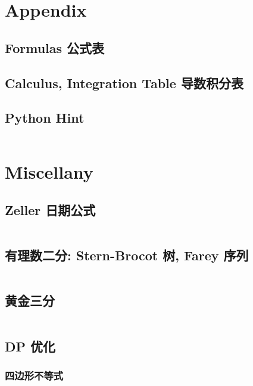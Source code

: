 \documentclass[titlepage, a4paper]{article}
\begin{document}
\begin{multicols}{2}
\begin{spacing}{0.6}
			
			\section{Appendix}
				\begin{spacing}{0.4}
				\subsection{Formulas 公式表}
					
				\subsection{Calculus, Integration Table 导数积分表}
					
					
				\subsection{Python Hint}
					\inputminted{python}{src/Miscellany/py.py}
				\end{spacing}

			\section{Miscellany}
				\subsection{Zeller 日期公式}
					\inputminted{cpp}{src/Miscellany/日期公式.cpp}
				\subsection{有理数二分: Stern-Brocot 树, Farey 序列}
					\inputminted{python}{src/yzh/farey.py}
				\subsection{黄金三分}
					\inputminted[highlightlines={7}]{cpp}{src/yzh/golden_ternary.cpp}
				\subsection{DP 优化}
				\subsubsection{四边形不等式}
					\inputminted{cpp}{src/Miscellany/2D1D.cpp}
					

\end{spacing}
\end{multicols}
\end{document}
